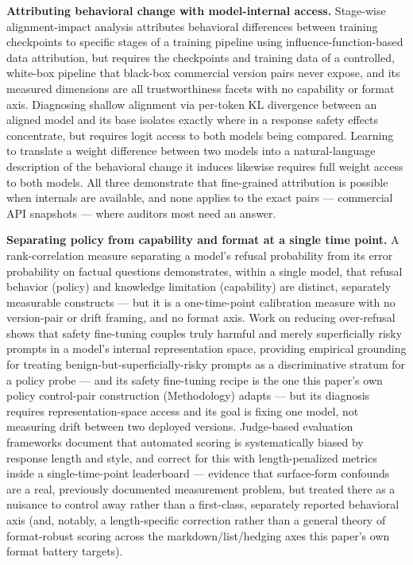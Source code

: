 \documentclass[11pt]{article}
\begin{document}
\textbf{Attributing behavioral change with model-internal access.} Stage-wise alignment-impact analysis \citep{MoreRLHFMoreTrustFpiC} attributes behavioral differences between training checkpoints to specific stages of a training pipeline using influence-function-based data attribution, but requires the checkpoints and training data of a controlled, white-box pipeline that black-box commercial version pairs never expose, and its measured dimensions are all trustworthiness facets with no capability or format axis. Diagnosing shallow alignment via per-token KL divergence between an aligned model and its base \citep{FewTokensDeep6Mxh} isolates exactly where in a response safety effects concentrate, but requires logit access to both models being compared. Learning to translate a weight difference between two models into a natural-language description of the behavioral change it induces \citep{DiffInterpretation6As4} likewise requires full weight access to both models. All three demonstrate that fine-grained attribution is possible when internals are available, and none applies to the exact pairs --- commercial API snapshots --- where auditors most need an answer.

\textbf{Separating policy from capability and format at a single time point.} A rank-correlation measure separating a model's refusal probability from its error probability on factual questions \citep{RefusalIndex9gJB} demonstrates, within a single model, that refusal behavior (policy) and knowledge limitation (capability) are distinct, separately measurable constructs --- but it is a one-time-point calibration measure with no version-pair or drift framing, and no format axis. Work on reducing over-refusal \citep{ContrastiveOverRefusalGXcN} shows that safety fine-tuning couples truly harmful and merely superficially risky prompts in a model's internal representation space, providing empirical grounding for treating benign-but-superficially-risky prompts as a discriminative stratum for a policy probe --- and its safety fine-tuning recipe is the one this paper's own policy control-pair construction (Methodology) adapts --- but its diagnosis requires representation-space access and its goal is fixing one model, not measuring drift between two deployed versions. Judge-based evaluation frameworks \citep{WildBenchMKEH} document that automated scoring is systematically biased by response length and style, and correct for this with length-penalized metrics inside a single-time-point leaderboard --- evidence that surface-form confounds are a real, previously documented measurement problem, but treated there as a nuisance to control away rather than a first-class, separately reported behavioral axis (and, notably, a length-specific correction rather than a general theory of format-robust scoring across the markdown/list/hedging axes this paper's own format battery targets).
\end{document}
